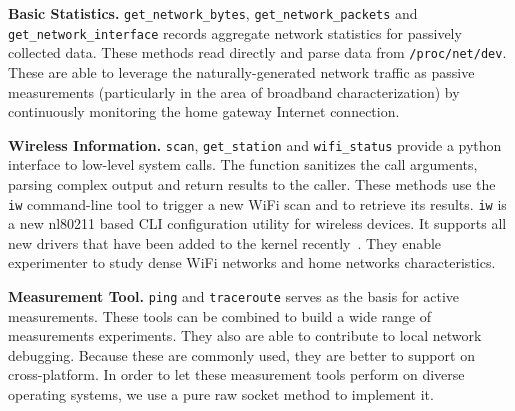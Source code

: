 {\textbf{Basic Statistics.} \texttt{get\_network\_bytes}, \texttt{get\_network\_packets} and \texttt{get\_network\_interface} records aggregate network statistics for passively collected data. These methods read directly and parse data from \texttt{/proc/net/dev}. These are able to leverage the naturally-generated network traffic as passive measurements (particularly in the area of broadband characterization) by continuously monitoring the home gateway Internet connection.

\textbf{Wireless Information.} \texttt{scan}, \texttt{get\_station} and \texttt{wifi\_status} provide a python interface to low-level system calls. The function sanitizes the call arguments, parsing complex output and return results to the caller. These methods use the \texttt{iw} command-line tool to trigger a new WiFi scan and to retrieve its results. \texttt{iw} is a new nl80211 based CLI configuration utility for wireless devices. It supports all new drivers that have been added to the kernel recently~\cite{iw}. They enable experimenter to study dense WiFi networks and home networks characteristics.

\textbf{Measurement Tool.} \texttt{ping} and \texttt{traceroute} serves as the basis for active measurements. These tools can be combined to build a wide range of measurements experiments. They also are able to contribute to local network debugging. Because these are commonly used, they are better to support on cross-platform. In order to let these measurement tools perform on diverse operating systems, we use a pure raw socket method to implement it. 


}
